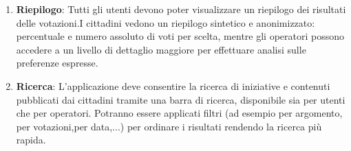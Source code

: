 \documentclass{article}
\begin{document}
\begin{enumerate}[label=\textbf{RF\arabic*}]
	\item  \textbf{Riepilogo}: Tutti gli utenti devono poter visualizzare un riepilogo dei risultati delle votazioni.I cittadini vedono un riepilogo sintetico e anonimizzato: percentuale e numero assoluto di voti per scelta, mentre gli operatori possono accedere a un livello di dettaglio maggiore per effettuare analisi sulle preferenze espresse.

	\item \textbf{Ricerca}: L’applicazione deve consentire la ricerca di iniziative e contenuti pubblicati dai cittadini tramite una barra di ricerca, disponibile sia per utenti che per operatori. Potranno essere applicati filtri (ad esempio per argomento, per votazioni,per data,...) per ordinare i risultati rendendo la ricerca più rapida.
\end{enumerate}
\end{document}
